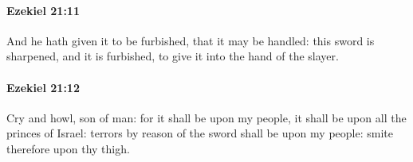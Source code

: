 		\paragraph{Ezekiel 21:11} %
			\label{EZEKIEL-21-11}

			And he hath given it to be furbished, that it may be handled: this sword is sharpened, and it is furbished, to give it into the hand of the slayer.


		\paragraph{Ezekiel 21:12} %
			\label{EZEKIEL-21-12}

			Cry and howl, son of man: for it shall be upon my people, it shall be upon all the princes of Israel: terrors by reason of the sword shall be upon my people: smite therefore upon thy thigh.


